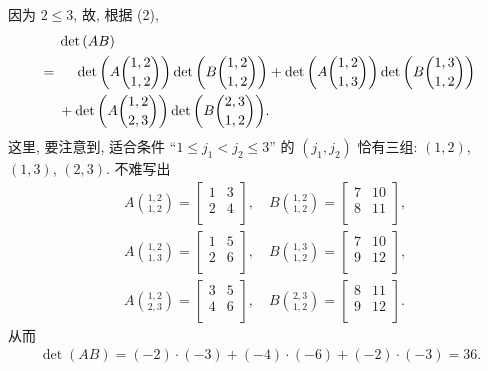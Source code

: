 \begin{example}
    因为 \(2 \leq 3\), 故, 根据 (2),
    \begin{align*}
             & \det {(AB)}
        \\
        = {} &
        \hphantom{{} + {}}
        \det {\left(A\binom{1,2}{1,2}\right)}
        \det {\left(B\binom{1,2}{1,2}\right)}
        + \det {\left(A\binom{1,2}{1,3}\right)}
        \det {\left(B\binom{1,3}{1,2}\right)}
        \\
             &
        + \det {\left(A\binom{1,2}{2,3}\right)}
        \det {\left(B\binom{2,3}{1,2}\right)}.
    \end{align*}
    这里, 要注意到, 适合条件
    ``\(1 \leq j_1 < j_2 \leq 3\)''
    的 \((j_1, j_2)\)
    恰有三组:
    \((1, 2)\), \((1, 3)\), \((2, 3)\).
    不难写出
    \begin{align*}
         & A\binom{1,2}{1,2}
        = \begin{bmatrix} 1&3\\2&4\\ \end{bmatrix},
        \quad
        B\binom{1,2}{1,2}
        = \begin{bmatrix} 7&10\\8&11\\ \end{bmatrix}, \\
         & A\binom{1,2}{1,3}
        = \begin{bmatrix} 1&5\\2&6\\ \end{bmatrix},
        \quad
        B\binom{1,3}{1,2}
        = \begin{bmatrix} 7&10\\9&12\\ \end{bmatrix}, \\
         & A\binom{1,2}{2,3}
        = \begin{bmatrix} 3&5\\4&6\\ \end{bmatrix},
        \quad
        B\binom{2,3}{1,2}
        = \begin{bmatrix} 8&11\\9&12\\ \end{bmatrix}.
    \end{align*}
    从而
    \begin{align*}
        \det {(AB)}
        = (-2) \cdot (-3) + (-4) \cdot (-6) + (-2) \cdot (-3)
        = 36.
    \end{align*}
\end{example}

